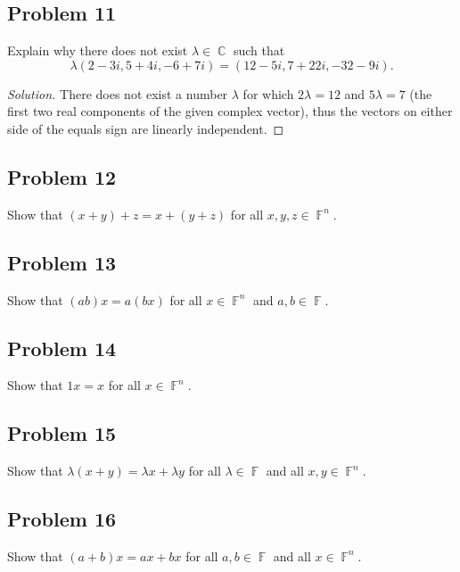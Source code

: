 \documentclass[letterpaper, 12pt]{amsart}
\DeclareMathOperator{\F}{\mathbb{F}}
\DeclareMathOperator{\C}{\mathbb{C}}
\theoremstyle{definition}  %
\begin{document}
		\subsection*{Problem 11}
		Explain why there does not exist $\lambda \in \C$ such that $$\lambda(2 - 3i, 5 + 4i, -6 + 7i) = (12 - 5i, 7 + 22i, -32 - 9i).$$

		\begin{proof}[Solution]
		There does not exist a number $\lambda$ for which $2 \lambda = 12$ and $5\lambda = 7$ (the first two real components of the given complex vector), thus the vectors on either side of the equals sign are linearly independent.
		\end{proof}

		\subsection*{Problem 12}
		Show that $(x + y) + z = x + (y + z)$ for all $x,y,z \in \F^{n}$.

		\subsection*{Problem 13}
		Show that $(ab)x = a(bx)$ for all $x \in \F^{n}$ and $a,b \in \F$.	

		\subsection*{Problem 14}
		Show that $1x = x$ for all $x \in \F^{n}$.

		\subsection*{Problem 15}
		Show that $\lambda(x + y) = \lambda x + \lambda y$ for all $\lambda \in \F$ and all $x,y \in \F^{n}$.	

		\subsection*{Problem 16}
		Show that $(a + b)x = ax + bx$ for all $a,b \in \F$ and all $x \in \F^{n}$.
\end{document}
